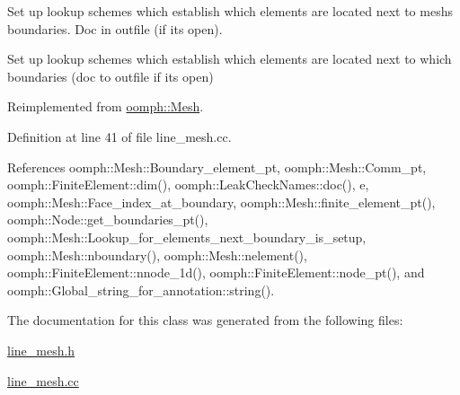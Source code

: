 Set up lookup schemes which establish which elements are located next to mesh\textquotesingle{}s boundaries. Doc in outfile (if it\textquotesingle{}s open). 

Set up lookup schemes which establish which elements are located next to which boundaries (doc to outfile if it\textquotesingle{}s open) 

Reimplemented from \hyperlink{classoomph_1_1Mesh_a413cbcbea4fb1111703da9ee97429640}{oomph\+::\+Mesh}.



Definition at line 41 of file line\+\_\+mesh.\+cc.



References oomph\+::\+Mesh\+::\+Boundary\+\_\+element\+\_\+pt, oomph\+::\+Mesh\+::\+Comm\+\_\+pt, oomph\+::\+Finite\+Element\+::dim(), oomph\+::\+Leak\+Check\+Names\+::doc(), e, oomph\+::\+Mesh\+::\+Face\+\_\+index\+\_\+at\+\_\+boundary, oomph\+::\+Mesh\+::finite\+\_\+element\+\_\+pt(), oomph\+::\+Node\+::get\+\_\+boundaries\+\_\+pt(), oomph\+::\+Mesh\+::\+Lookup\+\_\+for\+\_\+elements\+\_\+next\+\_\+boundary\+\_\+is\+\_\+setup, oomph\+::\+Mesh\+::nboundary(), oomph\+::\+Mesh\+::nelement(), oomph\+::\+Finite\+Element\+::nnode\+\_\+1d(), oomph\+::\+Finite\+Element\+::node\+\_\+pt(), and oomph\+::\+Global\+\_\+string\+\_\+for\+\_\+annotation\+::string().



The documentation for this class was generated from the following files\+:\begin{DoxyCompactItemize}
\item 
\hyperlink{line__mesh_8h}{line\+\_\+mesh.\+h}\item 
\hyperlink{line__mesh_8cc}{line\+\_\+mesh.\+cc}\end{DoxyCompactItemize}
